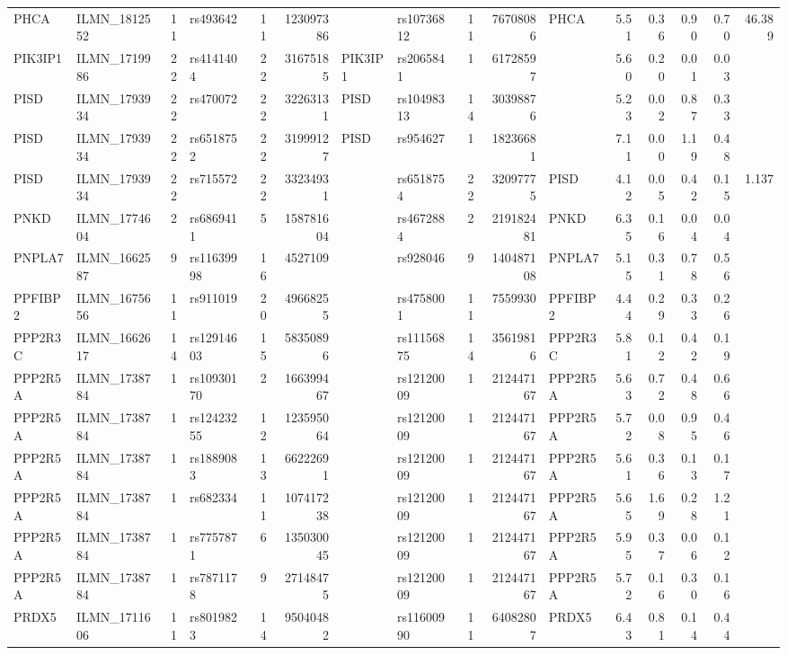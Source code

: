 \documentclass{article}
\begin{document}
\begin{landscape}
{\begin{ThreePartTable}
\begin{longtable}{|llr|lrrl|lrrl|rrrr|r|}
  PHCA & ILMN\_1812552 & 11 & rs493642 & 11 & 123097386 &  & rs10736812 & 11 & 76708086 & PHCA & 5.51 & 0.36 & 0.90 & 0.70 & 46.389 \\
  PIK3IP1 & ILMN\_1719986 & 22 & rs4141404 & 22 & 31675185 & PIK3IP1 & rs2065841 & 1 & 61728597 &  & 5.60 & 0.20 & 0.01 & 0.03 &  \\
  PISD & ILMN\_1793934 & 22 & rs470072 & 22 & 32263131 & PISD & rs10498313 & 14 & 30398876 &  & 5.23 & 0.02 & 0.87 & 0.33 &  \\
  PISD & ILMN\_1793934 & 22 & rs6518752 & 22 & 31999127 & PISD & rs954627 & 1 & 18236681 &  & 7.11 & 0.00 & 1.19 & 0.48 &  \\
  PISD & ILMN\_1793934 & 22 & rs715572 & 22 & 33234931 &  & rs6518754 & 22 & 32097775 & PISD & 4.12 & 0.05 & 0.42 & 0.15 & 1.137 \\
  PNKD & ILMN\_1774604 & 2 & rs6869411 & 5 & 158781604 &  & rs4672884 & 2 & 219182481 & PNKD & 6.35 & 0.16 & 0.04 & 0.04 &  \\
  PNPLA7 & ILMN\_1662587 & 9 & rs11639998 & 16 & 4527109 &  & rs928046 & 9 & 140487108 & PNPLA7 & 5.15 & 0.31 & 0.78 & 0.56 &  \\
  PPFIBP2 & ILMN\_1675656 & 11 & rs911019 & 20 & 49668255 &  & rs4758001 & 11 & 7559930 & PPFIBP2 & 4.44 & 0.29 & 0.33 & 0.26 &  \\
  PPP2R3C & ILMN\_1662617 & 14 & rs12914603 & 15 & 58350896 &  & rs11156875 & 14 & 35619816 & PPP2R3C & 5.81 & 0.12 & 0.42 & 0.19 &  \\
  PPP2R5A & ILMN\_1738784 & 1 & rs10930170 & 2 & 166399467 &  & rs12120009 & 1 & 212447167 & PPP2R5A & 5.63 & 0.72 & 0.48 & 0.66 &  \\
  PPP2R5A & ILMN\_1738784 & 1 & rs12423255 & 12 & 123595064 &  & rs12120009 & 1 & 212447167 & PPP2R5A & 5.72 & 0.08 & 0.95 & 0.46 &  \\
  PPP2R5A & ILMN\_1738784 & 1 & rs1889083 & 13 & 66222691 &  & rs12120009 & 1 & 212447167 & PPP2R5A & 5.61 & 0.36 & 0.13 & 0.17 &  \\
  PPP2R5A & ILMN\_1738784 & 1 & rs682334 & 11 & 107417238 &  & rs12120009 & 1 & 212447167 & PPP2R5A & 5.65 & 1.69 & 0.28 & 1.21 &  \\
  PPP2R5A & ILMN\_1738784 & 1 & rs7757871 & 6 & 135030045 &  & rs12120009 & 1 & 212447167 & PPP2R5A & 5.95 & 0.37 & 0.06 & 0.12 &  \\
  PPP2R5A & ILMN\_1738784 & 1 & rs7871178 & 9 & 27148475 &  & rs12120009 & 1 & 212447167 & PPP2R5A & 5.72 & 0.16 & 0.30 & 0.16 &  \\
  PRDX5 & ILMN\_1711606 & 11 & rs8019823 & 14 & 95040482 &  & rs11600990 & 11 & 64082807 & PRDX5 & 6.43 & 0.81 & 0.14 & 0.44 &  \\

\end{longtable}
\end{ThreePartTable}}
\end{landscape}
\end{document}
